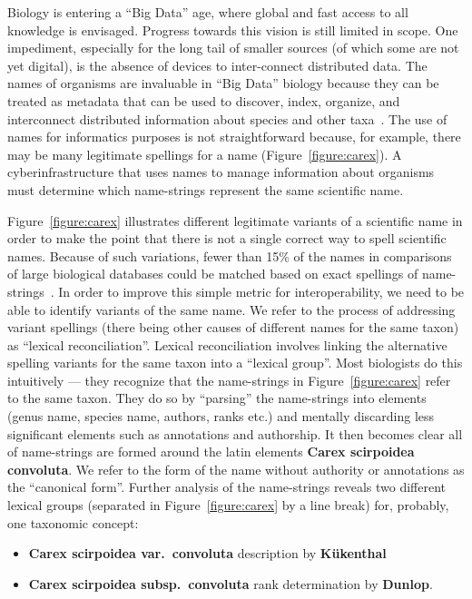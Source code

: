 \documentclass{bmcart}
\begin{document}
Biology is entering a ``Big Data'' age, where global and fast access to all knowledge is envisaged. Progress towards this vision is still limited in scope. One impediment, especially for the long tail of smaller sources (of which some are not yet digital), is the absence of devices to inter-connect distributed data. The names of organisms are invaluable in ``Big Data'' biology because they can be treated as metadata that can be used to discover, index, organize, and interconnect distributed information about species and other taxa~\cite{Patterson2010}. The use of names for informatics purposes is not straightforward because, for example, there may be many legitimate spellings for a name (Figure~\ref{figure:carex}). A cyberinfrastructure that uses names to manage information about organisms must determine which name-strings represent the same scientific name.

Figure~\ref{figure:carex} illustrates different legitimate variants of a scientific name in order to make the point that there is not a single correct way to spell scientific names. Because of such variations, fewer than 15\% of the names in comparisons of large biological databases could be matched based on exact spellings of name-strings~\cite{Patterson2016}. In order to improve this simple metric for interoperability, we need to be able to identify variants of the same name. We refer to the process of addressing variant spellings (there being other causes of different names for the same taxon) as ``lexical reconciliation''.  Lexical reconciliation involves linking the alternative spelling variants for the same taxon into a ``lexical group''. Most biologists do this intuitively --- they recognize that the name-strings in Figure~\ref{figure:carex} refer to the same taxon. They do so by ``parsing'' the name-strings into elements (genus name, species name, authors, ranks etc.) and mentally discarding less significant elements such as annotations and authorship. It then becomes clear all of name-strings are formed around the latin elements  \textbf{Carex scirpoidea convoluta}. We refer to the form of the name without authority or annotations as the ``canonical form''. Further analysis of the name-strings  reveals two different lexical groups (separated in Figure~\ref{figure:carex} by a line break) for, probably, one taxonomic concept:

\begin{itemize}

  \item \textbf{Carex scirpoidea var.\ convoluta} description by
    \textbf{Kükenthal}

  \item \textbf{Carex scirpoidea subsp.\ convoluta} rank determination by
    \textbf{Dunlop}.

\end{itemize}
\end{document}
